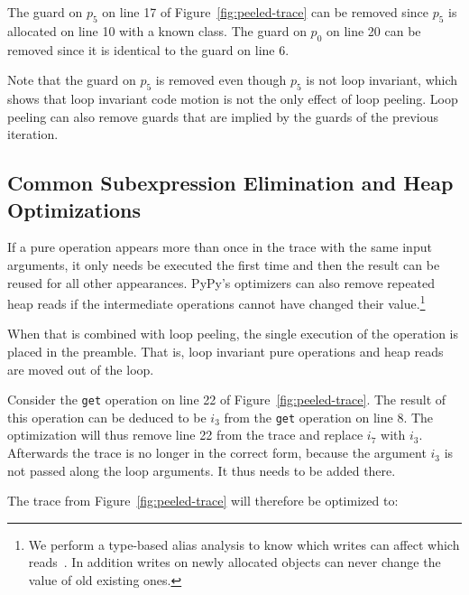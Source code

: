\documentclass[preprint]{sigplanconf}
\let\oldcite=\cite
\renewcommand\cite[1]{\ifthenelse{\equal{#1}{XXX}}{[citation~needed]}{\oldcite{#1}}}
\begin{document}
The guard on $p_5$ on line 17 of Figure~\ref{fig:peeled-trace} can be
removed since $p_5$ is allocated on line 10 with a known class. The
guard on $p_0$ on line 20 can be removed since it is identical to the
guard on line 6.

Note that the guard on $p_5$ is removed even though $p_5$ is not loop
invariant, which shows that loop invariant code motion is not the only
effect of loop peeling. Loop peeling can also remove guards that are implied by
the guards of the previous iteration.



\subsection{Common Subexpression Elimination and Heap Optimizations}

If a pure operation appears more than once in the trace with the same input
arguments, it only needs be executed the first time and then the result
can be reused for all other appearances. PyPy's optimizers can also remove
repeated heap reads if the intermediate operations cannot have changed their
value.\footnote{We perform a type-based alias analysis to know which
writes can affect which reads~\cite{XXX}. In addition writes on newly allocated objects
can never change the value of old existing ones.}

When that is combined with loop peeling, the single execution of the operation
is placed in the preamble. That is, loop invariant pure operations and heap
reads are moved out of the loop. 

Consider the \lstinline{get} operation on line 22 of
Figure~\ref{fig:peeled-trace}. The result of this operation can be
deduced to be $i_3$ from the \lstinline{get} operation on line
8. The optimization will thus remove line 22 from the trace and
replace $i_7$ with $i_3$. Afterwards the trace is no longer in the correct
form, because the argument $i_3$ is not passed along the loop arguments. It
thus needs to be added there.

The trace from Figure~\ref{fig:peeled-trace} will therefore be optimized to:
\end{document}
